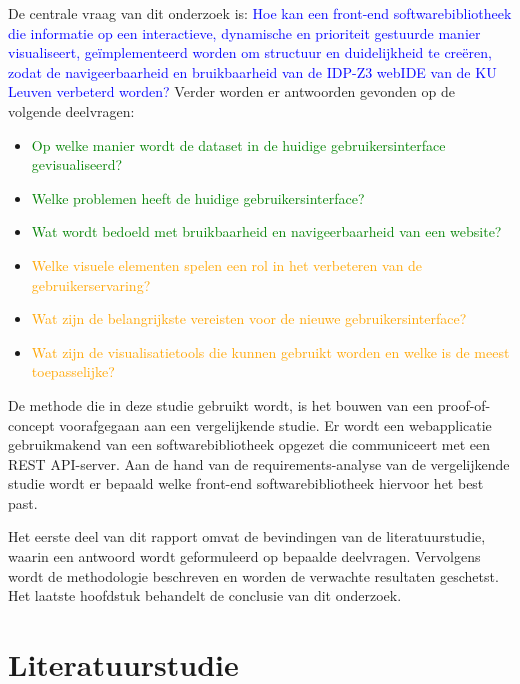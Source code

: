 De centrale vraag van dit onderzoek is: \textcolor{blue}{Hoe kan een front-end softwarebibliotheek die informatie op een interactieve, dynamische en prioriteit gestuurde manier visualiseert, geïmplementeerd worden om structuur en duidelijkheid te creëren, zodat de navigeerbaarheid en bruikbaarheid van de IDP-Z3 webIDE van de KU Leuven verbeterd worden?} Verder worden er antwoorden gevonden op de volgende deelvragen:
\begin{itemize}
    \item \textcolor{green}{Op welke manier wordt de dataset in de huidige gebruikersinterface gevisualiseerd?}
    \item \textcolor{green}{Welke problemen heeft de huidige gebruikersinterface?}
    \item \textcolor{green}{Wat wordt bedoeld met bruikbaarheid en navigeerbaarheid van een website?}
    \item \textcolor{orange}{Welke visuele elementen spelen een rol in het verbeteren van de gebruikerservaring?}
    \item \textcolor{orange}{Wat zijn de belangrijkste vereisten voor de nieuwe gebruikersinterface?}
    \item \textcolor{orange}{Wat zijn de visualisatietools die kunnen gebruikt worden en welke is de meest toepasselijke?}
\end{itemize}

De methode die in deze studie gebruikt wordt, is het bouwen van een proof-of-concept voorafgegaan aan een vergelijkende studie. Er wordt een webapplicatie gebruikmakend van een softwarebibliotheek opgezet die communiceert met een REST API-server. Aan de hand van de require\-ments-analyse van de vergelijkende studie wordt er bepaald welke front-end softwarebibliotheek hiervoor het best past.

Het eerste deel van dit rapport omvat de bevindingen van de literatuurstudie, waarin een antwoord wordt geformuleerd op bepaalde deelvragen. Vervolgens wordt de methodologie beschreven en worden de verwachte resultaten gesch\-etst. Het laatste hoofdstuk behandelt de conclusie van dit onderzoek.


\section{Literatuurstudie}%
\label{sec:literatuurstudie}

